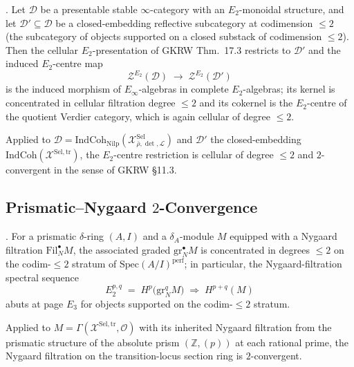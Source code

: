 \begin{theorem}
\label{v4-arith:w6-g:thm:gkrw-2-convergence}
\ClaimStatusConjectured. Let \(\mathcal{D}\) be a presentable stable
\(\infty\)-category with an \(E_{2}\)-monoidal structure, and let
\(\mathcal{D}'\subseteq\mathcal{D}\) be a closed-embedding reflective
subcategory at codimension \(\leq 2\) (the subcategory of objects
supported on a closed substack of codimension \(\leq 2\)). Then the
cellular \(E_{2}\)-presentation of GKRW Thm.~17.3 restricts to
\(\mathcal{D}'\) and the induced \(E_{2}\)-centre map
\begin{equation}
\label{v4-arith:w6-g:eq:gkrw-centre-restriction}
\mathcal{Z}^{E_{2}}(\mathcal{D})\;\longrightarrow\;\mathcal{Z}^{E_{2}}(\mathcal{D}')
\end{equation}
is the induced morphism of \(E_{\infty}\)-algebras in complete
\(E_{2}\)-algebras; its kernel is concentrated in cellular filtration
degree \(\leq 2\) and its cokernel is the \(E_{2}\)-centre of the
quotient Verdier category, which is again cellular of degree \(\leq 2\).

Applied to
\(\mathcal{D}=\mathrm{IndCoh}_{\mathrm{Nilp}}(\mathcal{X}^{\mathrm{Sel}}_{\bar\rho,\det,\mathcal{L}})\)
and \(\mathcal{D}'\) the closed-embedding
\(\mathrm{IndCoh}(\mathcal{X}^{\mathrm{Sel},\mathrm{tr}})\), the
\(E_{2}\)-centre restriction is cellular of degree \(\leq 2\) and
\(2\)-convergent in the sense of GKRW \S 11.3.
\end{theorem}

\subsection{Prismatic--Nygaard \(2\)-Convergence}

\begin{theorem}
\label{v4-arith:w6-g:thm:bl-2-convergence}
\ClaimStatusConjectured. For a prismatic \(\delta\)-ring \((A,I)\) and a
\(\delta_{A}\)-module \(M\) equipped with a Nygaard filtration
\(\mathrm{Fil}^{\bullet}_{N}M\), the associated graded
\(\mathrm{gr}^{\bullet}_{N}M\) is concentrated in degrees \(\leq 2\)
on the codim-\(\leq 2\) stratum of
\(\mathrm{Spec}(A/I)^{\mathrm{perf}}\); in particular, the
Nygaard-filtration spectral sequence
\begin{equation}
\label{v4-arith:w6-g:eq:bl-nygaard-ss}
E_{2}^{p,q}\;=\;H^{p}\bigl(\mathrm{gr}^{q}_{N}M\bigr)\;\Rightarrow\;H^{p+q}(M)
\end{equation}
abuts at page \(E_{3}\) for objects supported on the codim-\(\leq 2\)
stratum.

Applied to \(M=\Gamma(\mathcal{X}^{\mathrm{Sel},\mathrm{tr}},\mathcal{O})\)
with its inherited Nygaard filtration from the prismatic structure
of the absolute prism \((\mathbb{Z},(p))\) at each rational prime, the
Nygaard filtration on the transition-locus section ring is
\(2\)-convergent.
\end{theorem}

